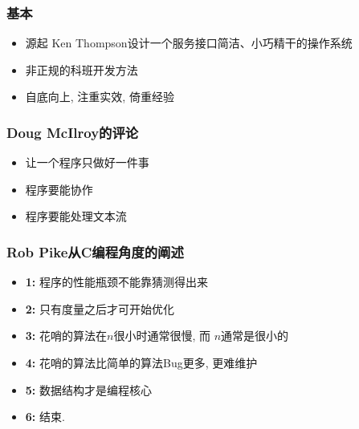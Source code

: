 \documentclass[compress]{beamer}
\begin{document}
\begin{frame}
\frametitle{基本}
\begin{itemize}
\item 源起 Ken Thompson设计一个服务接口简洁、小巧精干的操作系统
\item 非正规的科班开发方法
\item 自底向上, 注重实效, 倚重经验
\end{itemize}

\end{frame}

\begin{frame}
\frametitle{Doug McIlroy的评论}
\begin{itemize}
\item 让一个程序只做好一件事
\item 程序要能协作
\item 程序要能处理文本流
\end{itemize}

\end{frame}

\begin{frame}
\frametitle{Rob Pike从C编程角度的阐述}

\begin{itemize}
\item \textbf{1:} 程序的性能瓶颈不能靠猜测得出来

\item \textbf{2:} 只有度量之后才可开始优化

\item \textbf{3:} 花哨的算法在$n$很小时通常很慢, 而 $n$通常是很小的

\item \textbf{4:} 花哨的算法比简单的算法Bug更多, 更难维护

\item \textbf{5:} 数据结构才是编程核心

\item \textbf{6:} 结束.
\end{itemize}

\end{frame}
\end{document}
